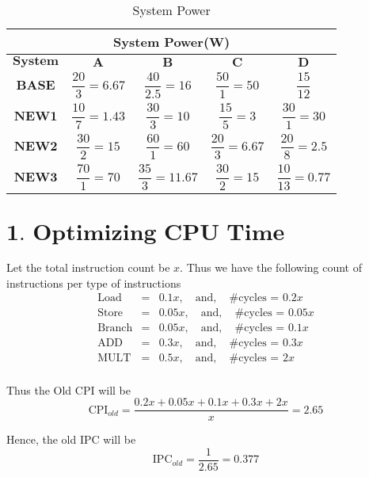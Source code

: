\documentclass{tufte-handout}
\begin{document}
	\begin{table}[!ht]
	    \centering
	    \selectfont
		\renewcommand{\arraystretch}{3.0}
		\label{tab:abs-power}
	    \begin{tabular}{c|c|c|c|c}
	      \toprule
		  \multicolumn{5}{|c|}{System Power(W)}  \\
	      \midrule 
		  $\textbf{System}$ & $\textbf{A}$ & $\textbf{B}$ & $\textbf{C}$ & $\textbf{D}$ \\  %
		  $\textbf{BASE}$ & $\dfrac{20}{3}=6.67$ & $\dfrac{40}{2.5} = 16$ & $\dfrac{50}{1} = 50$ & $\dfrac{15}{12}$ \\ 
		  $\textbf{NEW1}$ & $\dfrac{10}{7}=1.43$ & $\dfrac{30}{3} = 10$ & $\dfrac{15}{5} = 3$ & $\dfrac{30}{1} = 30$ \\ 
		  $\textbf{NEW2}$ & $\dfrac{30}{2}=15$ & $\dfrac{60}{1} = 60$ & $\dfrac{20}{3} = 6.67$ & $\dfrac{20}{8} = 2.5$ \\ 
		  $\textbf{NEW3}$ & $\dfrac{70}{1}=70$ & $\dfrac{35}{3} = 11.67$ & $\dfrac{30}{2} = 15$ & $\dfrac{10}{13} = 0.77$ \\
	      \bottomrule
	    \end{tabular}
	    \caption{ System Power }
	  \end{table}


\section{$\textbf{1. Optimizing CPU Time}$}
	Let the total instruction count be $x$. Thus we have the following count of instructions per type of instructions
	\begin{eqnarray*}
		\mbox{Load} &=& 0.1 x, \quad\mbox{and}, \quad\mbox{\# cycles = } 0.2x \\
		\mbox{Store} &=& 0.05 x, \quad\mbox{and}, \quad\mbox{\# cycles = } 0.05x \\
		\mbox{Branch} &=& 0.05 x, \quad\mbox{and}, \quad\mbox{\# cycles = } 0.1x \\
		\mbox{ADD} &=& 0.3 x, \quad\mbox{and}, \quad\mbox{\# cycles = } 0.3x \\
		\mbox{MULT} &=& 0.5 x, \quad\mbox{and}, \quad\mbox{\# cycles = } 2x \\
	\end{eqnarray*}

	Thus the Old CPI will be 
	\[\mbox{CPI}_{old} = \dfrac{0.2x + 0.05x + 0.1x + 0.3x + 2x}{x} = 2.65 \]

	Hence, the old IPC will be
	\[\mbox{IPC}_{old} = \dfrac{1}{2.65} = 0.377 \]
\end{document}
